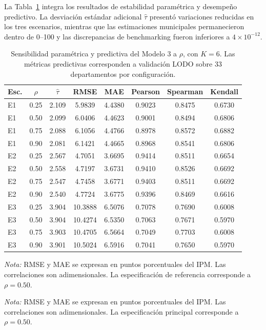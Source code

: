 La Tabla~\ref{tab:sensibilidad-rho-lodo} integra los
resultados de estabilidad paramétrica y desempeño
predictivo. La desviación estándar adicional
$\hat{\tau}$ presentó variaciones reducidas en los
tres escenarios, mientras que las estimaciones
municipales permanecieron dentro de 0--100 y
las discrepancias de benchmarking fueron
inferiores a $4\times10^{-12}$.


\begin{table}[!htbp]
\centering
\footnotesize
\caption{Sensibilidad paramétrica y predictiva del Modelo 3 a $\rho$, con $K=6$. Las métricas predictivas corresponden a validación LODO sobre 33 departamentos por configuración.}
\label{tab:sensibilidad-rho}
\label{tab:sensibilidad-rho-lodo}

\renewcommand{\arraystretch}{1.05}
\setlength{\tabcolsep}{4pt}

\begin{tabular}{l c c c c c c c}
\hline
Esc. & $\rho$ & $\hat{\tau}$ & RMSE & MAE & Pearson & Spearman & Kendall \\
\hline
E1 & 0.25 & 2.109 & 5.9839 & 4.4380 & 0.9023 & 0.8475 & 0.6730 \\
E1 & 0.50 & 2.099 & 6.0406 & 4.4623 & 0.9001 & 0.8494 & 0.6806 \\
E1 & 0.75 & 2.088 & 6.1056 & 4.4766 & 0.8978 & 0.8572 & 0.6882 \\
E1 & 0.90 & 2.081 & 6.1421 & 4.4665 & 0.8968 & 0.8541 & 0.6806 \\
\hline
E2 & 0.25 & 2.567 & 4.7051 & 3.6695 & 0.9414 & 0.8511 & 0.6654 \\
E2 & 0.50 & 2.558 & 4.7197 & 3.6731 & 0.9410 & 0.8526 & 0.6692 \\
E2 & 0.75 & 2.547 & 4.7458 & 3.6771 & 0.9403 & 0.8511 & 0.6692 \\
E2 & 0.90 & 2.540 & 4.7724 & 3.6775 & 0.9396 & 0.8469 & 0.6616 \\
\hline
E3 & 0.25 & 3.904 & 10.3888 & 6.5076 & 0.7078 & 0.7690 & 0.6008 \\
E3 & 0.50 & 3.904 & 10.4274 & 6.5350 & 0.7063 & 0.7671 & 0.5970 \\
E3 & 0.75 & 3.903 & 10.4705 & 6.5664 & 0.7049 & 0.7703 & 0.6008 \\
E3 & 0.90 & 3.901 & 10.5024 & 6.5916 & 0.7041 & 0.7650 & 0.5970 \\
\hline
\end{tabular}

\vspace{2mm}
\parbox{0.95\linewidth}{\footnotesize
\textit{Nota:} RMSE y MAE se expresan en puntos porcentuales del IPM. Las correlaciones son adimensionales. La especificación de referencia corresponde a $\rho=0.50$.}


\vspace{2mm}
\parbox{0.95\linewidth}{\footnotesize
\textit{Nota:} RMSE y MAE se expresan en puntos
porcentuales del IPM. Las correlaciones son
adimensionales. La especificación principal
corresponde a $\rho=0.50$.}
\end{table}


